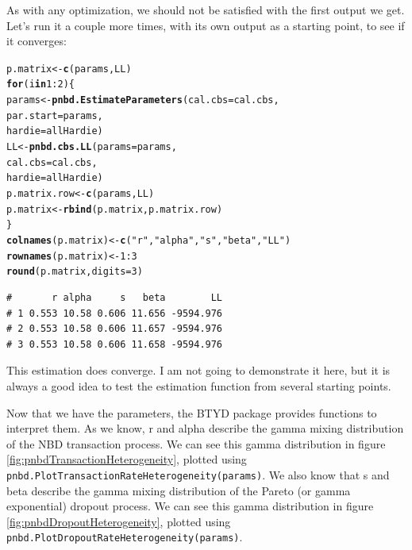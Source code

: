 \documentclass[10pt, letterpaper, onecolumn, oneside, final]{article}\usepackage[]{graphicx}\usepackage[]{color}
\makeatletter
\newcommand{\hlnum}[1]{\textcolor[rgb]{0.686,0.059,0.569}{#1}}%
\newcommand{\hlstr}[1]{\textcolor[rgb]{0.192,0.494,0.8}{#1}}%
\newcommand{\hlopt}[1]{\textcolor[rgb]{0,0,0}{#1}}%
\newcommand{\hlstd}[1]{\textcolor[rgb]{0.345,0.345,0.345}{#1}}%
\newcommand{\hlkwa}[1]{\textcolor[rgb]{0.161,0.373,0.58}{\textbf{#1}}}%
\newcommand{\hlkwb}[1]{\textcolor[rgb]{0.69,0.353,0.396}{#1}}%
\newcommand{\hlkwc}[1]{\textcolor[rgb]{0.333,0.667,0.333}{#1}}%
\newcommand{\hlkwd}[1]{\textcolor[rgb]{0.737,0.353,0.396}{\textbf{#1}}}%
\newenvironment{kframe}{%
 \def\at@end@of@kframe{}%
 \ifinner\ifhmode%
  \def\at@end@of@kframe{\end{minipage}}%
  \begin{minipage}{\columnwidth}%
 \fi\fi%
 \def\FrameCommand##1{\hskip\@totalleftmargin \hskip-\fboxsep
 \colorbox{shadecolor}{##1}\hskip-\fboxsep
     \hskip-\linewidth \hskip-\@totalleftmargin \hskip\columnwidth}%
 \MakeFramed {\advance\hsize-\width
   \@totalleftmargin\z@ \linewidth\hsize
   \@setminipage}}%
 {\par\unskip\endMakeFramed%
 \at@end@of@kframe}
\newenvironment{knitrout}{}{} %
\makeatother
\begin{document}
As with any optimization, we should not be satisfied with the first
output we get. Let's run it a couple more times, with its own output
as a starting point, to see if it converges:

\begin{knitrout}
\color{fgcolor}\begin{kframe}
\begin{alltt}
\hlstd{p.matrix} \hlkwb{<-} \hlkwd{c}\hlstd{(params, LL)}
\hlkwa{for} \hlstd{(i} \hlkwa{in} \hlnum{1}\hlopt{:}\hlnum{2}\hlstd{)\{}
  \hlstd{params} \hlkwb{<-} \hlkwd{pnbd.EstimateParameters}\hlstd{(}\hlkwc{cal.cbs} \hlstd{= cal.cbs,}
                                    \hlkwc{par.start} \hlstd{= params,}
                                    \hlkwc{hardie} \hlstd{= allHardie)}
  \hlstd{LL} \hlkwb{<-} \hlkwd{pnbd.cbs.LL}\hlstd{(}\hlkwc{params} \hlstd{= params,}
                    \hlkwc{cal.cbs} \hlstd{= cal.cbs,}
                    \hlkwc{hardie} \hlstd{= allHardie)}
  \hlstd{p.matrix.row} \hlkwb{<-} \hlkwd{c}\hlstd{(params, LL)}
  \hlstd{p.matrix} \hlkwb{<-} \hlkwd{rbind}\hlstd{(p.matrix, p.matrix.row)}
\hlstd{\}}
\hlkwd{colnames}\hlstd{(p.matrix)} \hlkwb{<-} \hlkwd{c}\hlstd{(}\hlstr{"r"}\hlstd{,} \hlstr{"alpha"}\hlstd{,} \hlstr{"s"}\hlstd{,} \hlstr{"beta"}\hlstd{,} \hlstr{"LL"}\hlstd{)}
\hlkwd{rownames}\hlstd{(p.matrix)} \hlkwb{<-} \hlnum{1}\hlopt{:}\hlnum{3}
\hlkwd{round}\hlstd{(p.matrix,} \hlkwc{digits} \hlstd{=} \hlnum{3}\hlstd{)}
\end{alltt}
\begin{verbatim}
#       r alpha     s   beta        LL
# 1 0.553 10.58 0.606 11.656 -9594.976
# 2 0.553 10.58 0.606 11.657 -9594.976
# 3 0.553 10.58 0.606 11.658 -9594.976
\end{verbatim}
\end{kframe}
\end{knitrout}

This estimation does converge. I am not going to demonstrate it here,
but it is always a good idea to test the estimation function
from several starting points.

Now that we have the parameters, the BTYD package provides functions
to interpret them. As we know, r and alpha describe the gamma mixing
distribution of the NBD transaction process. We can see this gamma
distribution in figure \ref{fig:pnbdTransactionHeterogeneity}, plotted
using \texttt{pnbd.PlotTransactionRateHeterogeneity(params)}. We also
know that s and beta describe the gamma mixing distribution of the
Pareto (or gamma exponential) dropout process. We can see this gamma
distribution in figure \ref{fig:pnbdDropoutHeterogeneity}, plotted
using \texttt{pnbd.PlotDropoutRateHeterogeneity(params)}.
\end{document}
